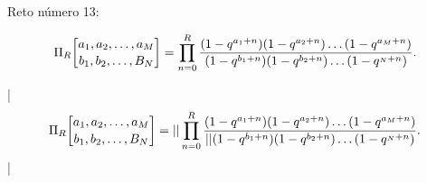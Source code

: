 

\bigskip

\enunciadoS Reto n\'umero 13:

$$\Pi_R{a_1,a_2,\dots,a_M\atopwithdelims[]b_1,b_2,\dots,B_N}=
\prod_{n=0}^R{(1-q^{a_1+n})(1-q^{a_2+n})\dots(1-q^{a_M+n})\over
(1-q^{b_1+n})(1-q^{b_2+n})\dots(1-q^{_N+n})}.$$

\bigskip

\respuestaS

|$$\Pi_R{a_1,a_2,\dots,a_M\atopwithdelims[]b_1,b_2,\dots,B_N}=|

|\prod_{n=0}^R{(1-q^{a_1+n})(1-q^{a_2+n})\dots(1-q^{a_M+n})\over|

|(1-q^{b_1+n})(1-q^{b_2+n})\dots(1-q^{_N+n})}.$$|

\bye

